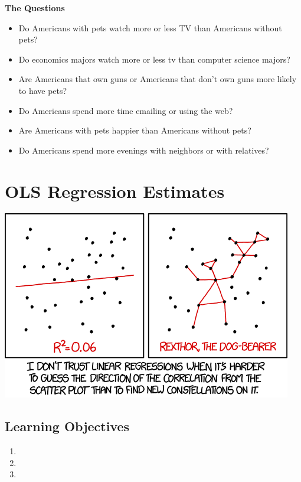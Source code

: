\documentclass[
]{book}
\providecommand{\tightlist}{%
  \setlength{\itemsep}{0pt}\setlength{\parskip}{0pt}}
\theoremstyle{definition}
\theoremstyle{definition}
\theoremstyle{definition}
\theoremstyle{definition}
\theoremstyle{remark}
\begin{document}
\textbf{The Questions}

\begin{itemize}
\tightlist
\item
  Do Americans with pets watch more or less TV than Americans without pets?
\item
  Do economics majors watch more or less tv than computer science majors?
\item
  Are Americans that own guns or Americans that don't own guns more likely to have pets?
\item
  Do Americans spend more time emailing or using the web?
\item
  Are Americans with pets happier than Americans without pets?
\item
  Do Americans spend more evenings with neighbors or with relatives?
\end{itemize}

\hypertarget{ols-regression-estimates}{%
\chapter{OLS Regression Estimates}\label{ols-regression-estimates}}

\includegraphics{./images/linear_regression.png}

\hypertarget{learning-objectives-7}{%
\section{Learning Objectives}\label{learning-objectives-7}}

\begin{enumerate}
\def\labelenumi{\arabic{enumi}.}
\tightlist
\item
\item
\item
\end{enumerate}
\end{document}
